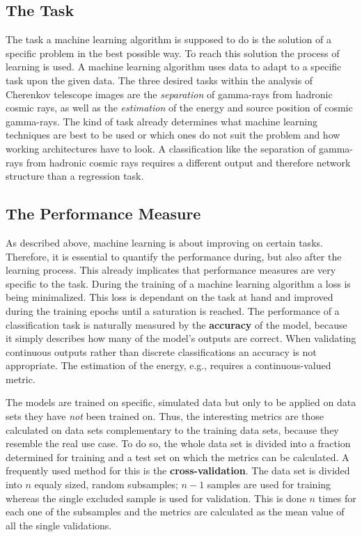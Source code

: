 \subsection{The Task}
%
The task a machine learning algorithm is supposed to do is the solution of a
specific problem in the best possible way. To reach this solution the process
of learning is used. A machine learning algorithm uses data to adapt to a specific task upon the given data. The three desired tasks
within the analysis of Cherenkov telescope images are the \textit{separation} of
gamma-rays from hadronic cosmic rays, as well as the \textit{estimation} of the
energy and source position of cosmic gamma-rays. The kind of task already
determines what machine learning techniques are best to be used or which ones
do not suit the problem and how working architectures have to look. A
classification like the separation of gamma-rays from hadronic cosmic rays
requires a different output and therefore network structure than a regression
task.

\subsection{The Performance Measure}
%
As described above, machine learning is about improving on certain tasks.
Therefore, it is essential to quantify the performance during, but also after the
learning process. This already implicates that performance measures are very
specific to the task. During the training of a machine learning algorithm a
loss is being minimalized. This loss is dependant on the task at hand and improved during the training epochs until a saturation is reached. The performance of a classification task is naturally
measured by the \textbf{accuracy} of the model, because it simply describes how
many of the model's outputs are correct. When validating continuous outputs
rather than discrete classifications an accuracy is not appropriate. The
estimation of the energy, e.g., requires a continuous-valued metric.

The models are trained on specific, simulated data but only to be applied on
data sets they have \textit{not} been trained on. Thus, the interesting metrics
are those calculated on data sets complementary to the training data sets,
because they resemble the real use case. To do so, the whole data set is divided
into a fraction determined for training and a test set on which the metrics can
be calculated. A frequently used method for this is the
\textbf{cross-validation}. The data set is divided into $n$ equaly sized, random
subsamples; $n-1$ samples are used for training whereas the single excluded
sample is used for validation. This is done $n$ times for each one of the
subsamples and the metrics are calculated as the mean value of all the single
validations.

